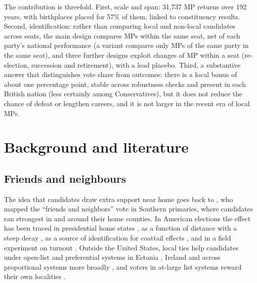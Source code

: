 \documentclass[11pt,a4paper]{article}
\begin{document}
The contribution is threefold. First, scale and span: 31{,}737 MP returns over 192 years, with birthplaces placed for 57\% of them, linked to constituency results. Second, identification: rather than comparing local and non-local candidates across seats, the main design compares MPs within the same seat, net of each party's national performance (a variant compares only MPs of the same party in the same seat), and three further designs exploit changes of MP within a seat (re-election, succession and retirement), with a lead placebo. Third, a substantive answer that distinguishes vote share from outcomes: there is a local bonus of about one percentage point, stable across robustness checks and present in each British nation (less certainly among Conservatives), but it does not reduce the chance of defeat or lengthen careers, and it is not larger in the recent era of local MPs.

\section{Background and literature}
\subsection{Friends and neighbours}
The idea that candidates draw extra support near home goes back to \citet{key1949}, who mapped the ``friends and neighbors'' vote in Southern primaries, where candidates ran strongest in and around their home counties. In American elections the effect has been traced in presidential home states \citep{lewisbeckrice1983}, as a function of distance with a steep decay \citep{gimpel2008}, as a source of identification for coattail effects \citep{meredith2013}, and in a field experiment on turnout \citep{panagopoulos2017}. Outside the United States, local ties help candidates under open-list and preferential systems in Estonia \citep{tavits2010}, Ireland \citep{goreckimarsh2012} and across proportional systems more broadly \citep{shugart2005}, and voters in at-large list systems reward their own localities \citep{fivahalse2016}.
\end{document}
